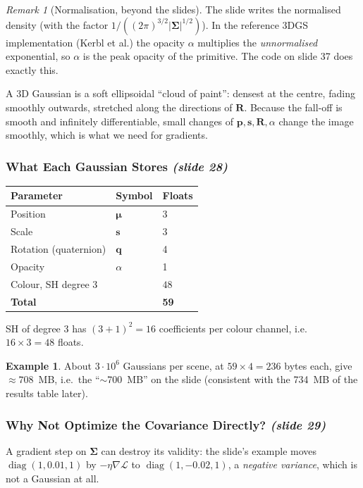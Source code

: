 \documentclass[11pt,a4paper]{article}
\newcommand{\sr}[1]{\texorpdfstring{\emph{(#1)}}{(#1)}}
\newcommand{\Lc}{\mathcal{L}}
\DeclareMathOperator{\diag}{diag}
\theoremstyle{definition}
\newtheorem{example}[definition]{Example}
\theoremstyle{plain}
\theoremstyle{remark}
\newtheorem{remark}[definition]{Remark}
\begin{document}
\begin{remark}[Normalisation, beyond the slides]
The slide writes the normalised density (with the factor $1/((2\pi)^{3/2}|\bm\Sigma|^{1/2})$). In the reference 3DGS implementation (Kerbl et al.) the opacity $\alpha$ multiplies the \emph{unnormalised} exponential, so $\alpha$ is the peak opacity of the primitive. The code on slide 37 does exactly this.
\end{remark}

\begin{intuition}
A 3D Gaussian is a soft ellipsoidal ``cloud of paint'': densest at the centre, fading smoothly outwards, stretched along the directions of $\bm R$. Because the fall-off is smooth and infinitely differentiable, small changes of $\bm p,\bm s,\bm R,\alpha$ change the image smoothly, which is what we need for gradients.
\end{intuition}

\subsubsection{What Each Gaussian Stores \sr{slide 28}}
\begin{center}
\begin{tabular}{@{}lll@{}}
\toprule
Parameter & Symbol & Floats \\ \midrule
Position & $\bm\mu$ & 3 \\
Scale & $\bm s$ & 3 \\
Rotation (quaternion) & $\bm q$ & 4 \\
Opacity & $\alpha$ & 1 \\
Colour, SH degree 3 & & $48$ \\ \midrule
\textbf{Total} & & \textbf{59} \\ \bottomrule
\end{tabular}
\end{center}
SH of degree 3 has $(3+1)^2=16$ coefficients per colour channel, i.e.\ $16\times3=48$ floats.

\begin{example}
About $3\cdot10^{6}$ Gaussians per scene, at $59\times4=236$ bytes each, give $\approx708$~MB, i.e.\ the ``$\sim$700~MB'' on the slide (consistent with the 734~MB of the results table later).
\end{example}

\subsubsection{Why Not Optimize the Covariance Directly? \sr{slide 29}}
A gradient step on $\bm\Sigma$ can destroy its validity: the slide's example moves $\diag(1,0.01,1)$ by $-\eta\nabla\Lc$ to $\diag(1,-0.02,1)$, a \emph{negative variance}, which is not a Gaussian at all.
\end{document}
